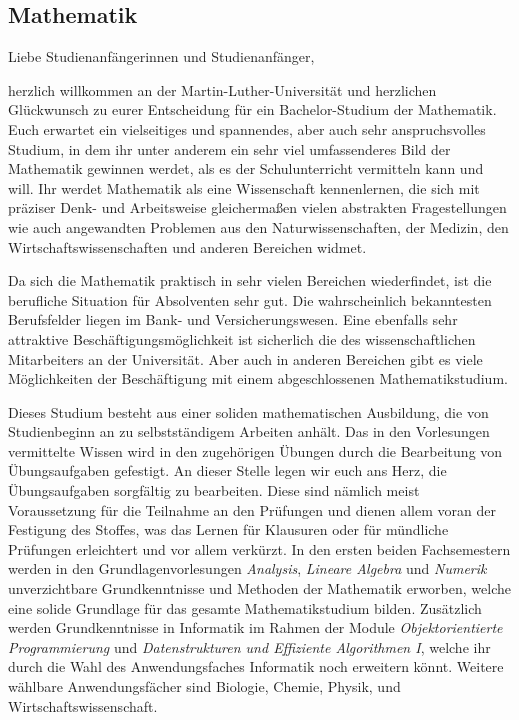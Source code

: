 \subsection{Mathematik}
\label{studiengang_mathematik}

Liebe Studienanfängerinnen und Studienanfänger,\par

herzlich willkommen an der Martin-Luther-Universität und herzlichen Glückwunsch zu eurer Entscheidung für ein Bachelor-Studium der Mathematik.
Euch erwartet ein vielseitiges und spannendes, aber auch sehr anspruchsvolles Studium, in dem ihr unter anderem ein sehr viel umfassenderes Bild der Mathematik gewinnen werdet, als es der Schulunterricht vermitteln kann und will.
Ihr werdet Mathematik als eine Wissenschaft kennenlernen, die sich mit präziser Denk- und Arbeitsweise gleichermaßen vielen abstrakten Fragestellungen wie auch angewandten Problemen aus den Naturwissenschaften, der Medizin, den Wirtschaftswissenschaften und anderen Bereichen widmet.

Da sich die Mathematik praktisch in sehr vielen Bereichen wiederfindet, ist die berufliche Situation für Absolventen sehr gut.
Die wahrscheinlich bekanntesten Berufsfelder liegen im Bank- und Versicherungswesen.
Eine ebenfalls sehr attraktive Beschäftigungsmöglichkeit ist sicherlich die des wissenschaftlichen Mitarbeiters an der Universität.
Aber auch in anderen Bereichen gibt es viele Möglichkeiten der Beschäftigung mit einem abgeschlossenen Mathematikstudium.

Dieses Studium besteht aus einer soliden mathematischen Ausbildung, die von Studienbeginn an zu selbstständigem Arbeiten anhält. Das in den Vorlesungen vermittelte Wissen wird in den zugehörigen Übungen durch die Bearbeitung von Übungsauf\-gaben gefestigt.
An dieser Stelle legen wir euch ans Herz, die Übungsaufgaben sorgfältig zu bearbeiten. Diese sind nämlich meist Voraussetzung für die Teilnahme an den Prüfungen und dienen allem voran der Festigung des Stoffes, was das Lernen für Klausuren oder für mündliche Prüfungen erleichtert und vor allem verkürzt. 
In den ersten beiden Fachsemestern werden in den Grundlagenvorlesungen \textit{Analysis}, \textit{Lineare Algebra} und \textit{Numerik} unverzichtbare Grundkenntnisse und Methoden der Mathematik erworben, welche eine solide Grundlage für das gesamte Mathematikstudium bilden. Zusätzlich werden Grundkenntnisse in Informatik im Rahmen der Module \textit{Objektorientierte Programmierung} und \textit{Datenstrukturen und Effiziente Algorithmen I}, welche ihr durch die Wahl des Anwendungsfaches Informatik noch erweitern könnt. Weitere wählbare
Anwendungsfächer sind Biologie, Chemie, Physik, und Wirtschaftswissenschaft.

